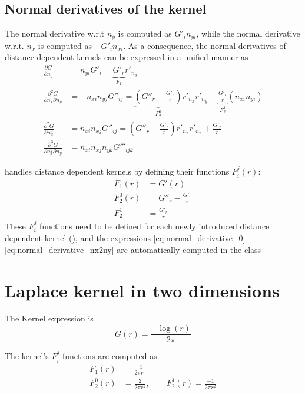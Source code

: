 \subsection{Normal derivatives of the kernel}

The normal derivative w.r.t $n_y$ is computed as $G'_i n_{yi}$, while the normal derivative w.r.t. $n_x$ is computed as $-G'_i n_{xi}$.
As a consequence, the normal derivatives of distance dependent kernels can be expressed in a unified manner as
%
\begin{align}
	\frac{\partial G}{\partial n_y} 
	&= n_{yi} G'_i
	= \underbrace{G'_r}_{F_1} r'_{n_y}
	\label{eq:normal_derivative_0}
	\\
	\frac{\partial^2 G}{\partial n_x \partial n_y}
	&= -n_{xi} n_{yj} G''_{ij}
	=  \underbrace{\left(G''_r - \frac{G'_r}{r} \right)}_{F_2^0} r'_{n_x} r'_{n_y} -  \underbrace{\frac{G'_r}{r}}_{F_2^1} \left(n_{xi} n_{yi}\right)
	\\
	\frac{\partial^2 G}{\partial n_x^2}
	&= n_{xi} n_{xj} G''_{ij}
	= \left(G''_r - \frac{G'_r}{r} \right) r'_{n_x} r'_{n_x} +  \frac{G'_r}{r}
	\\
	\frac{\partial^3 G}{\partial n_x^2 \partial n_y}
	&= n_{xi} n_{xj} n_{yk} G'''_{ijk}
	\label{eq:normal_derivative_nx2ny}
\end{align}

\NiHu{} handles distance dependent kernels by defining their functions $F_i^j(r)$:
%
\begin{align}
	F_1(r) &= G'(r) \\
	F_2^0(r) &= G''_r - \frac{G'_r}{r} \\
	F_2^1 &= \frac{G'_r}{r}
\end{align}
%
These $F_i^j$ functions need to be defined for each newly introduced distance dependent kernel (), and the expressions \eqref{eq:normal_derivative_0}-\eqref{eq:normal_derivative_nx2ny} are automatically computed in the class 


\section{Laplace kernel in two dimensions}

The Kernel expression is
%
\begin{equation}
	G(r) = \frac{-\log(r)}{2\pi}
\end{equation}

The kernel's $F_i^j$ functions are computed as
%
\begin{align}
	F_1(r) &= \frac{-1}{2\pi r} \\
	F_2^0(r) &= \frac{2}{2\pi r^2}, \qquad F_2^1(r) = \frac{-1}{2\pi r^2}
\end{align}

